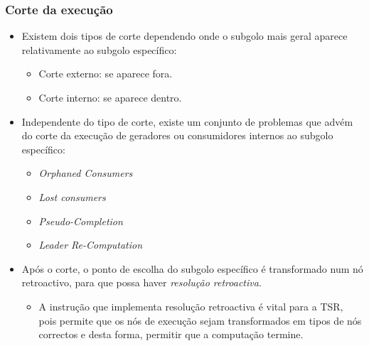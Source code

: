 \documentclass{beamer}
\begin{document}
\begin{frame}
   \frametitle{Corte da execução}
   \begin{itemize}
      \item Existem dois tipos de corte dependendo onde o subgolo mais geral aparece relativamente ao subgolo específico:
      \begin{itemize}
         \item Corte externo: se aparece fora.
         \item Corte interno: se aparece dentro.
      \end{itemize}
      \pause
      \item Independente do tipo de corte, existe um conjunto de problemas que advém do corte da execução
      de geradores ou consumidores internos ao subgolo específico:
      \begin{itemize}
         \item \emph{Orphaned Consumers}
         \item \emph{Lost consumers}
         \item \emph{Pseudo-Completion}
         \item \emph{Leader Re-Computation}
      \end{itemize}
      \pause
      \item Após o corte, o ponto de escolha do subgolo específico é transformado num nó retroactivo,
      para que possa haver \emph{resolução retroactiva}.
      \begin{itemize}
         \item A instrução que implementa resolução retroactiva é vital para a TSR, pois permite que
         os nós de execução sejam transformados em tipos de nós correctos e desta forma, permitir
         que a computação termine.
      \end{itemize}
   \end{itemize}
\end{frame}

\end{document}
